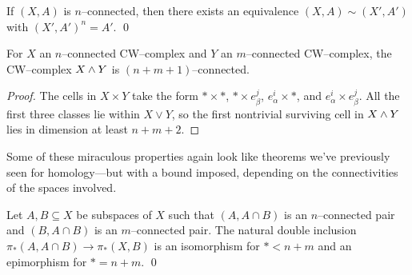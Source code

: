 \begin{lemma}\label{NConnectedSpacesHaveSmallModels}%
If $(X, A)$ is $n$--connected, then there exists an equivalence $(X, A) \sim (X', A')$ with $(X', A')^n = A'$. \qed
{}
\end{lemma}

\begin{corollary}
For $X$ an $n$--connected CW--complex and $Y$ an $m$--connected CW--complex, the CW--complex $X \wedge Y$ is $(n+m+1)$--connected.
\end{corollary}
\begin{proof}
The cells in $X \times Y$ take the form $* \times *$, $* \times e_\beta^j$, $e_\alpha^i \times *$, and $e_\alpha^i \times e_\beta^j$.
All the first three classes lie within $X \vee Y$, so the first nontrivial surviving cell in $X \wedge Y$ lies in dimension at least $n + m + 2$.
\end{proof}

\noindent Some of these miraculous properties again look like theorems we've previously seen for homology---but with a bound imposed, depending on the connectivities of the spaces involved.

\begin{theorem}\label{HomotopyExcision}%
Let $A, B \subseteq X$ be subspaces of $X$ such that $(A, A \cap B)$ is an $n$--connected pair and $(B, A \cap B)$ is an $m$--connected pair.
The natural double inclusion $\pi_*(A, A \cap B) \to \pi_*(X, B)$ is an isomorphism for $* < n+m$ and an epimorphism for $* = n+m$. \qed
\end{theorem}

